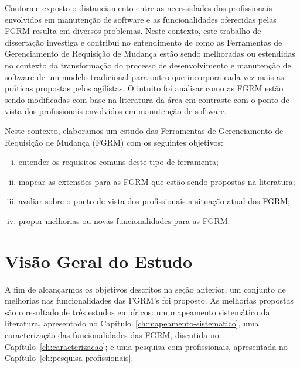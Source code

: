 Conforme exposto o distanciamento entre as necessidades dos profissionais
envolvidos em manutenção de software e as funcionalidades oferecidas pelas FGRM
resulta em diversos problemas. Neste contexto, este trabalho de dissertação
investiga e contribui no entendimento de como as Ferramentas de Gerenciamento de
Requisição de Mudança estão sendo melhoradas ou estendidas no contexto da
transformação do processo de desenvolvimento e manutenção de software de um
modelo tradicional para outro que incorpora cada vez mais as práticas propostas
pelos agilistas. O intuito foi analisar como as FGRM estão sendo modificadas com
base na literatura da área em contraste com o ponto de vista dos profissionais
envolvidos em manutenção de software.

Neste contexto, elaboramos um estudo das Ferramentas de Gerenciamento de
Requisição de Mudança (FGRM) com os seguintes objetivos:
\begin{enumerate}[(i)]
	\item entender os requisitos comuns deste tipo de ferramenta;
	\item mapear as extensões para as FGRM que estão sendo propostas na
		literatura;
	\item avaliar sobre o ponto de vista dos profissionais a
		situação atual dos FGRM\@;
	\item propor melhorias ou novas funcionalidades para as FGRM\@.
\end{enumerate}


\section{Visão Geral do Estudo}
\label{sec:intro-visao-geral}


A fim de alcançarmos os objetivos descritos na seção anterior, um conjunto de
melhorias nas funcionalidades das FGRM's foi proposto. As melhorias propostas
são o resultado de três estudos empíricos: um mapeamento sistemático da
literatura, apresentado no Capítulo~\ref{ch:mapeamento-sistematico}, uma
caracterização das funcionalidades das FGRM, discutida no
Capítulo~\ref{ch:caracterizacao}; e uma pesquisa com profissionais, apresentada
no Capítulo~\ref{ch:pesquisa-profissionais}.

